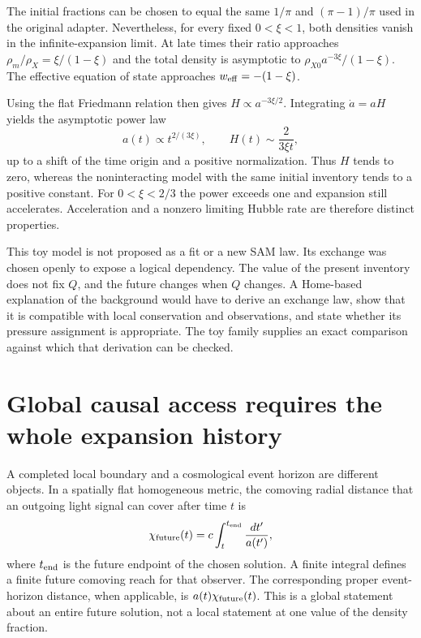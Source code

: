 The initial fractions can be chosen to equal the same $1/\pi$ and $(\pi-1)/\pi$ used in the original adapter. Nevertheless, for every fixed $0<\xi<1$, both densities vanish in the infinite-expansion limit. At late times their ratio approaches $\rho_m/\rho_X=\xi/(1-\xi)$ and the total density is asymptotic to $\rho_{X0}a^{-3\xi}/(1-\xi)$. The effective equation of state approaches $w_{\rm eff}=-(1-\xi)$.

Using the flat Friedmann relation then gives $H\propto a^{-3\xi/2}$. Integrating $\dot a=aH$ yields the asymptotic power law
\begin{equation}
 a(t)\propto t^{2/(3\xi)},\qquad H(t)\sim\frac{2}{3\xi t},
 \label{c12:powerfuture}
\end{equation}
up to a shift of the time origin and a positive normalization. Thus $H$ tends to zero, whereas the noninteracting model with the same initial inventory tends to a positive constant. For $0<\xi<2/3$ the power exceeds one and expansion still accelerates. Acceleration and a nonzero limiting Hubble rate are therefore distinct properties.

This toy model is not proposed as a fit or a new SAM law. Its exchange was chosen openly to expose a logical dependency. The value of the present inventory does not fix $Q$, and the future changes when $Q$ changes. A Home-based explanation of the background would have to derive an exchange law, show that it is compatible with local conservation and observations, and state whether its pressure assignment is appropriate. The toy family supplies an exact comparison against which that derivation can be checked.

\section{Global causal access requires the whole expansion history}
A completed local boundary and a cosmological event horizon are different objects. In a spatially flat homogeneous metric, the comoving radial distance that an outgoing light signal can cover after time $t$ is
\begin{equation}
 \chi_{\rm future}(t)=c\int_t^{t_{\rm end}}\frac{dt'}{a(t')},
 \label{c12:eventintegral}
\end{equation}
where $t_{\rm end}$ is the future endpoint of the chosen solution. A finite integral defines a finite future comoving reach for that observer. The corresponding proper event-horizon distance, when applicable, is $a(t)\chi_{\rm future}(t)$. This is a global statement about an entire future solution, not a local statement at one value of the density fraction.

